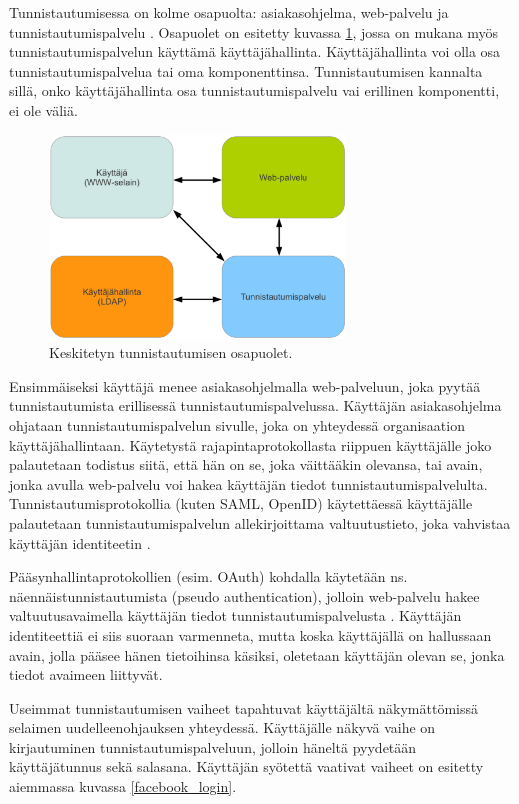 Tunnistautumisessa on kolme osapuolta: asiakasohjelma, web-palvelu ja tunnistautumispalvelu \cite{nisti}. Osapuolet on esitetty kuvassa \ref{composition}, jossa on mukana myös tunnistautumispalvelun käyttämä käyttäjähallinta. Käyttäjähallinta voi olla osa tunnistautumispalvelua tai oma komponenttinsa. Tunnistautumisen kannalta sillä, onko käyttäjähallinta osa tunnistautumispalvelu vai erillinen komponentti, ei ole väliä.

\begin{figure}[ht]
\centering
\includegraphics[width=0.7\textwidth]{teknologiat/composition.eps}
\caption{Keskitetyn tunnistautumisen osapuolet.}%
\label{composition}
\end{figure}

Ensimmäiseksi käyttäjä menee asiakasohjelmalla web-palveluun, joka pyytää tunnistautumista erillisessä tunnistautumispalvelussa. Käyttäjän asiakasohjelma ohjataan tunnistautumispalvelun sivulle, joka on yhteydessä organisaation käyttäjähallintaan. Käytetystä rajapintaprotokollasta riippuen käyttäjälle joko palautetaan todistus siitä, että hän on se, joka väittääkin olevansa, tai avain, jonka avulla web-palvelu voi hakea käyttäjän tiedot tunnistautumispalvelulta. Tunnistautumisprotokollia (kuten SAML, OpenID) käytettäessä käyttäjälle palautetaan tunnistautumispalvelun allekirjoittama valtuutustieto, joka vahvistaa käyttäjän identiteetin \cite{nisti}.

Pääsynhallintaprotokollien (esim. OAuth) kohdalla käytetään ns. näennäistunnistautumista (pseudo authentication), jolloin web-palvelu hakee valtuutusavaimella käyttäjän tiedot tunnistautumispalvelusta \cite{distributed_web_security}. Käyttäjän identiteettiä ei siis suoraan varmenneta, mutta koska käyttäjällä on hallussaan avain, jolla pääsee hänen tietoihinsa käsiksi, oletetaan käyttäjän olevan se, jonka tiedot avaimeen liittyvät.

Useimmat tunnistautumisen vaiheet tapahtuvat käyttäjältä näkymättömissä selaimen uudelleenohjauksen yhteydessä. Käyttäjälle näkyvä vaihe on kirjautuminen tunnistautumispalveluun, jolloin häneltä pyydetään käyttäjätunnus sekä salasana. Käyttäjän syötettä vaativat vaiheet on esitetty aiemmassa kuvassa \ref{facebook_login}.